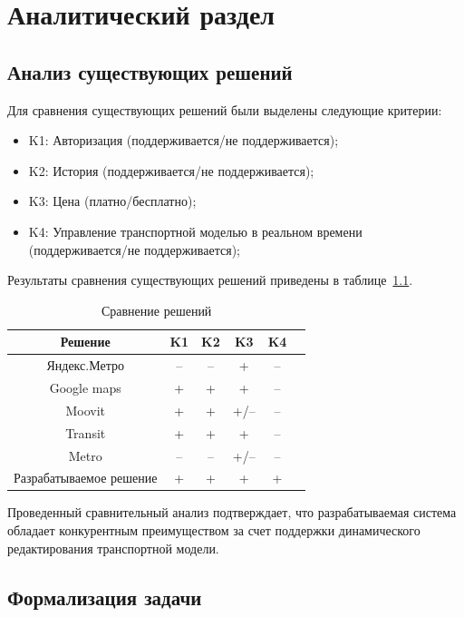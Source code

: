\chapter{Аналитический раздел}

\section{Анализ существующих решений}

Для сравнения существующих решений были выделены следующие критерии:
\begin{itemize}
	\item[---] K1: Авторизация (поддерживается/не поддерживается);
	\item[---] K2: История (поддерживается/не поддерживается);
	\item[---] K3: Цена (платно/бесплатно);
	\item[---] K4: Управление транспортной моделью в реальном времени (поддерживается/не поддерживается);
\end{itemize}

Результаты сравнения существующих решений приведены в таблице~\ref{tbl:cmp}.
\begin{table}[h]
	\begin{center}
		\caption{\label{tbl:cmp} Сравнение решений}
		\begin{tabular}{|c|c|c|c|c|c|}
			\hline
			Решение & K1 & K2 & K3 & K4 \\
			\hline
			Яндекс.Метро & -- & -- & + & -- \\
			\hline
			Google maps & + & + & + & -- \\
			\hline
			Moovit & + & + & +/-- & -- \\
			\hline
			Transit & + & + & + & -- \\
			\hline
			Metro & -- & -- & +/-- & -- \\
			\hline
			Разрабатываемое решение & + & + & + & + \\
			\hline
		\end{tabular}
	\end{center}
\end{table}

Проведенный сравнительный анализ подтверждает, что разрабатываемая система обладает конкурентным преимуществом за счет поддержки динамического редактирования транспортной модели.

\section{Формализация задачи}

